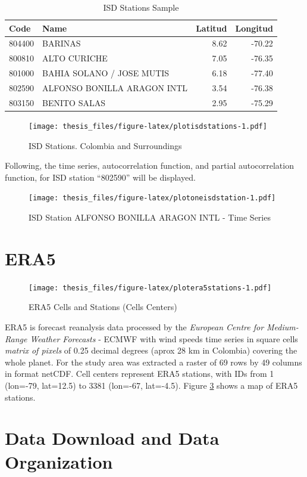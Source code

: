 \documentclass[12pt,oneside]{reedthesis}
\begin{document}
\begingroup\fontsize{10}{12}\selectfont
\begin{longtable}[t]{llrr}
\caption[ISD Stations Sample]{\label{tab:tableisdstations}ISD Stations Sample}\\
\toprule
Code & Name & Latitud & Longitud\\
\midrule
804400 & BARINAS & 8.62 & -70.22\\
800810 & ALTO CURICHE & 7.05 & -76.35\\
801000 & BAHIA SOLANO / JOSE MUTIS & 6.18 & -77.40\\
802590 & ALFONSO BONILLA ARAGON INTL & 3.54 & -76.38\\
803150 & BENITO SALAS & 2.95 & -75.29\\
\bottomrule
\end{longtable}
\endgroup{}
\begin{figure}
\centering
\texttt{[image: thesis\_files/figure-latex/plotisdstations-1.pdf]}
\caption{\label{fig:plotisdstations}ISD Stations. Colombia and Surroundings}
\end{figure}
Following, the time series, autocorrelation function, and partial autocorrelation function, for ISD station ``802590'' will be displayed.
\begin{figure}
\centering
\texttt{[image: thesis\_files/figure-latex/plotoneisdstation-1.pdf]}
\caption{\label{fig:plotoneisdstation}ISD Station ALFONSO BONILLA ARAGON INTL - Time Series}
\end{figure}
\hypertarget{era5}{%
\section{ERA5}\label{era5}}
\begin{figure}
\centering
\texttt{[image: thesis\_files/figure-latex/plotera5stations-1.pdf]}
\caption{\label{fig:plotera5stations}ERA5 Cells and Stations (Cells Centers)}
\end{figure}
ERA5 is forecast reanalysis data processed by the \emph{European Centre for Medium-Range Weather Forecasts} - ECMWF with wind speeds time series in square cells \emph{matrix of pixels} of 0.25 decimal degrees (aprox 28 km in Colombia) covering the whole planet. For the study area was extracted a raster of 69 rows by 49 columns in format netCDF. Cell centers represent ERA5 stations, with IDs from 1 (lon=-79, lat=12.5) to 3381 (lon=-67, lat=-4.5). Figure \ref{fig:plotera5stations} shows a map of ERA5 stations.

\hypertarget{data-download-and-data-organization}{%
\section{Data Download and Data Organization}\label{data-download-and-data-organization}}
\end{document}
